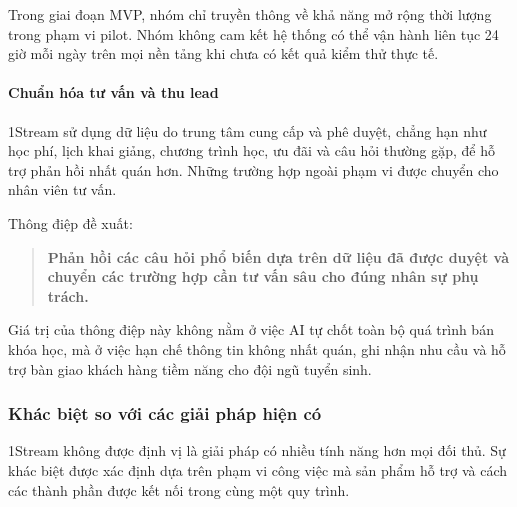 Trong giai đoạn MVP, nhóm chỉ truyền thông về khả năng mở rộng thời lượng trong phạm vi pilot. Nhóm không cam kết hệ thống có thể vận hành liên tục 24 giờ mỗi ngày trên mọi nền tảng khi chưa có kết quả kiểm thử thực tế.

\paragraph{Chuẩn hóa tư vấn và thu lead}

1Stream sử dụng dữ liệu do trung tâm cung cấp và phê duyệt, chẳng hạn như học phí, lịch khai giảng, chương trình học, ưu đãi và câu hỏi thường gặp, để hỗ trợ phản hồi nhất quán hơn. Những trường hợp ngoài phạm vi được chuyển cho nhân viên tư vấn.

Thông điệp đề xuất:

\begin{quote}
\textbf{Phản hồi các câu hỏi phổ biến dựa trên dữ liệu đã được duyệt và chuyển các trường hợp cần tư vấn sâu cho đúng nhân sự phụ trách.}
\end{quote}

Giá trị của thông điệp này không nằm ở việc AI tự chốt toàn bộ quá trình bán khóa học, mà ở việc hạn chế thông tin không nhất quán, ghi nhận nhu cầu và hỗ trợ bàn giao khách hàng tiềm năng cho đội ngũ tuyển sinh.

\subsubsection{Khác biệt so với các giải pháp hiện có}

1Stream không được định vị là giải pháp có nhiều tính năng hơn mọi đối thủ. Sự khác biệt được xác định dựa trên phạm vi công việc mà sản phẩm hỗ trợ và cách các thành phần được kết nối trong cùng một quy trình.

